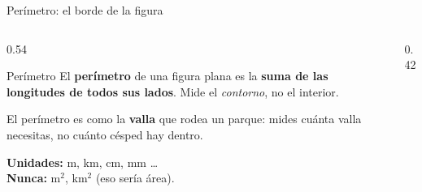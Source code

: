 \documentclass[aspectratio=169, 10pt, spanish]{beamer}
\begin{document}
\begin{frame}{Perímetro: el borde de la figura}
  \begin{columns}[c]
    \begin{column}{0.54\textwidth}
      \begin{definicionbox}{Perímetro}
        El \textbf{perímetro} de una figura plana es la
        \textbf{suma de las longitudes de todos sus lados}.
        Mide el \emph{contorno}, no el interior.
      \end{definicionbox}

      \vspace{0.4cm}
      \begin{notabox}[Analogía]
        \AlmFontSmall El perímetro es como la \textbf{valla} que rodea un parque:
        mides cuánta valla necesitas, no cuánto césped hay dentro.
      \end{notabox}

      \vspace{0.3cm}
      \textbf{Unidades:} m, km, cm, mm \ldots
      \\
      \textbf{Nunca:} m$^2$, km$^2$ (eso sería área).
    \end{column}
    \begin{column}{0.42\textwidth}
      \begin{center}
      \end{center}
    \end{column}
  \end{columns}
\end{frame}
\end{document}
